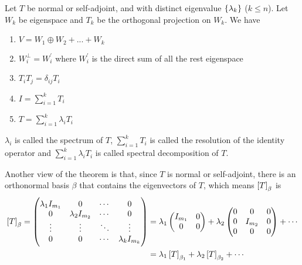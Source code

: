 \begin{theorem}
    Let $T$ be normal or self-adjoint, and with distinct eigenvalue $\set{\lambda_k}$ ($k \leq n$). Let $W_k$ be eigenspace and $T_k$ be the orthogonal projection on $W_k$. We have
    \begin{enumerate}
        \item $V = W_1 \oplus W_2 + ... + W_k$
        \item $W_i^\perp = W_i^\prime$ where $W_i^\prime$ is the direct sum of all the rest eigenspace
        \item $T_i T_j = \delta_{ij}T_i$
        \item $\displaystyle I = \sum_{i=1}^k T_i$
        \item $\displaystyle T = \sum_{i=1}^k \lambda_i T_i$
    \end{enumerate}
    
    $\lambda_i$ is called the spectrum of $T$, $\sum_{i=1}^k T_i$ is called the resolution of the identity operator and $\sum_{i=1}^k \lambda_i T_i$ is called spectral decomposition of $T$.
    
    
    Another view of the theorem is that, since $T$ is normal or self-adjoint, there is an orthonormal basis $\beta$ that contains the eigenvectors of $T$, which means $\coordinate{T}_\beta$ is
    \begin{equation}
        \begin{aligned}
        \coordinate{T}_\beta = \begin{pmatrix}
            \lambda_1 I_{m_1} & 0 & \cdots & 0 \\
            0 & \lambda_2 I_{m_2} & \cdots & 0 \\
            \vdots & \vdots & \ddots & \vdots \\
            0 & 0 & \cdots & \lambda_k I_{m_k}
        \end{pmatrix} &= \lambda_1 \begin{pmatrix}
        I_{m_1} & 0 \\
        0 & 0
    \end{pmatrix} + \lambda_2 \begin{pmatrix}
        0 & 0 & 0\\
        0 & I_{m_2} & 0 \\
        0 & 0 & 0
    \end{pmatrix} + \cdots \\
    &= \lambda_1 \coordinate{T}_{\beta_1} + \lambda_2 \coordinate{T}_{\beta_2} + \cdots
    \end{aligned}
    \end{equation}
\end{theorem}
